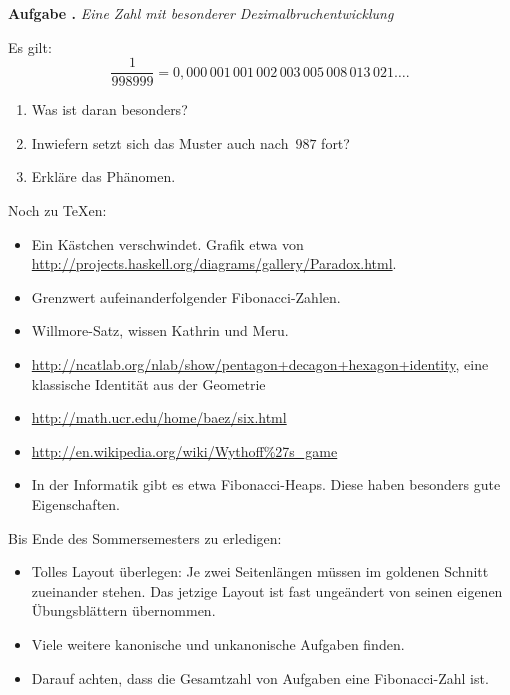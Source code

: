 \documentclass[a4paper,ngerman]{scrartcl}
\newlength{\aufgabenskip}
\newcounter{aufgabennummer}
\newenvironment{aufgabe}[1]{
  \addtocounter{aufgabennummer}{1}
  \textbf{Aufgabe \theaufgabennummer.} \emph{#1} \par
}{\vspace{\aufgabenskip}}
\begin{document}
\begin{aufgabe}{Eine Zahl mit besonderer Dezimalbruchentwicklung}
Es gilt:
\[ \frac{1}{998999} =
  0{,}000\,001\,001\,002\,003\,005\,008\,013\,021\ldots. \]
\begin{enumerate}
\item Was ist daran besonders?
\item Inwiefern setzt sich das Muster auch nach~$987$ fort?
\item Erkläre das Phänomen.
\end{enumerate}
\end{aufgabe}

\vfill

Noch zu \TeX{}en:
\begin{itemize}
\item Ein Kästchen verschwindet. Grafik etwa von
\url{http://projects.haskell.org/diagrams/gallery/Paradox.html}.
\item Grenzwert aufeinanderfolgender Fibonacci-Zahlen.
\item Willmore-Satz, wissen Kathrin und Meru.
\item \url{http://ncatlab.org/nlab/show/pentagon+decagon+hexagon+identity},
eine klassische Identität aus der Geometrie
\item \url{http://math.ucr.edu/home/baez/six.html}
\item \url{http://en.wikipedia.org/wiki/Wythoff%27s_game}
\item In der Informatik gibt es etwa Fibonacci-Heaps. Diese haben besonders
gute Eigenschaften.
\end{itemize}

Bis Ende des Sommersemesters zu erledigen:
\begin{itemize}
\item Tolles Layout überlegen: Je zwei Seitenlängen müssen im goldenen Schnitt
zueinander stehen. Das jetzige Layout ist fast ungeändert von seinen eigenen
Übungsblättern übernommen.
\item Viele weitere kanonische und unkanonische Aufgaben finden.
\item Darauf achten, dass die Gesamtzahl von Aufgaben eine Fibonacci-Zahl ist.
\end{itemize}
\end{document}
